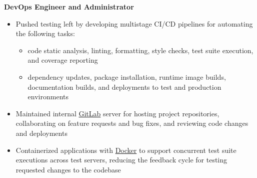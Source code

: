 \documentclass[a4paper]{article}
\begin{document}
\noindent
\hspace{0.120in}
\textbf{DevOps Engineer and Administrator}
\smallskip

\begin{itemize}
      \item Pushed testing left by developing multistage CI/CD pipelines for automating
            the following tasks:
            \begin{itemize}
                  \item code static analysis, linting, formatting, style checks, test
                        suite execution, and coverage reporting
                  \item dependency updates, package installation, runtime image builds,
                        documentation builds, and deployments to test and production
                        environments
            \end{itemize}
      \item Maintained internal \href{https://about.gitlab.com/}{GitLab} server for hosting
            project repositories, collaborating on feature requests and bug fixes, and
            reviewing code changes and deployments
      \item Containerized applications with
            \href{https://www.docker.com/why-docker}{Docker} to support concurrent test
            suite executions across test servers, reducing the feedback cycle for
            testing requested changes to the codebase
\end{itemize}
\end{document}
